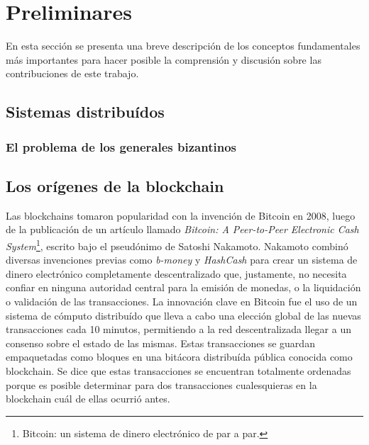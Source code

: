 \section{Preliminares}\label{sec:prelim}

En esta sección se presenta una breve descripción de los conceptos fundamentales
más importantes para hacer posible la comprensión y discusión sobre las
contribuciones de este trabajo.

\subsection{Sistemas distribuídos}
\subsubsection{El problema de los generales bizantinos}

\subsection{Los orígenes de la blockchain}
Las blockchains tomaron popularidad con la invención de Bitcoin en 2008, luego de la publicación
de un artículo llamado \textit{Bitcoin: A Peer-to-Peer
Electronic Cash System}\footnote{Bitcoin: un sistema de dinero electrónico de par a par.}, escrito
bajo el pseudónimo de Satoshi Nakamoto.
Nakamoto combinó diversas invenciones previas como
\textit{b-money} y \textit{HashCash} para crear un sistema de dinero electrónico completamente
descentralizado que, justamente, no necesita confiar en ninguna autoridad central para la emisión de monedas,
o la liquidación o validación de las transacciones. 
La innovación clave en Bitcoin fue el uso de un sistema de cómputo distribuído que lleva
a cabo una elección global de las nuevas transacciones cada 10 minutos, permitiendo
a la red descentralizada llegar a un consenso sobre el estado de las mismas. Estas transacciones
se guardan empaquetadas como bloques en una bitácora distribuída pública conocida como blockchain.
Se dice que estas transacciones se encuentran totalmente ordenadas porque es posible determinar para
dos transacciones cualesquieras en la blockchain cuál de ellas ocurrió antes.


